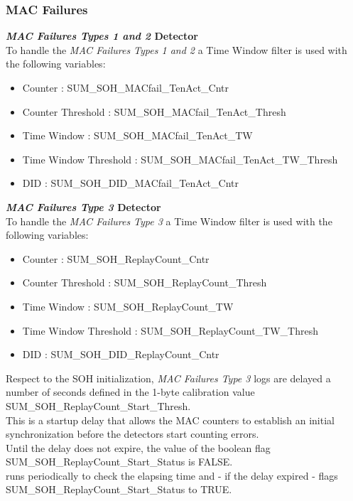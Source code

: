 \subsubsection{MAC Failures}
{
    \textbf{\textit{MAC Failures Types 1 and 2} Detector}\\
    To handle the \textit{MAC Failures Types 1 and 2} a Time Window filter is used  with the following variables:
    \begin{itemize}
        \item Counter               : SUM_SOH_MACfail_TenAct_Cntr
        \item Counter Threshold     : SUM_SOH_MACfail_TenAct_Thresh
        \item Time Window           : SUM_SOH_MACfail_TenAct_TW
        \item Time Window Threshold : SUM_SOH_MACfail_TenAct_TW_Thresh
        \item DID                   : SUM_SOH_DID_MACfail_TenAct_Cntr
    \end{itemize}
}
{
        
}

{
    \textbf{\textit{MAC Failures Type 3} Detector}\\
    To handle the \textit{MAC Failures Type 3} a Time Window filter is used  with the following variables:
    \begin{itemize}
        \item Counter               : SUM_SOH_ReplayCount_Cntr
        \item Counter Threshold     : SUM_SOH_ReplayCount_Thresh
        \item Time Window           : SUM_SOH_ReplayCount_TW
        \item Time Window Threshold : SUM_SOH_ReplayCount_TW_Thresh
        \item DID                   : SUM_SOH_DID_ReplayCount_Cntr
    \end{itemize}
}
{
        
}


{
	Respect to the SOH initialization, \textit{MAC Failures Type 3} logs are delayed a number of seconds defined in the 1-byte calibration value SUM_SOH_ReplayCount_Start_Thresh.\\
	This is a startup delay that allows the MAC counters to establish an initial synchronization before the detectors start counting errors.\\
	Until the delay does not expire, the value of the boolean flag SUM_SOH_ReplayCount_Start_Status is FALSE.\\
	 runs periodically to check the elapsing time and - if the delay expired - flags SUM_SOH_ReplayCount_Start_Status to TRUE.
	
}
{
  
}


